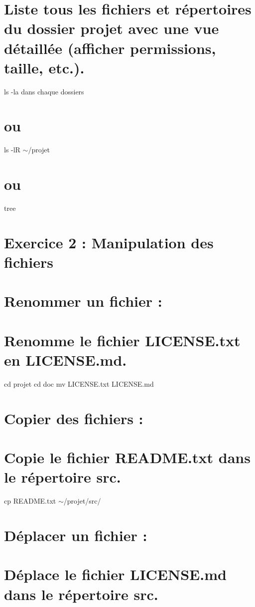 \section*{Liste tous les fichiers et répertoires du dossier projet avec une vue détaillée (afficher permissions, taille, etc.).}

ls -\/la dans chaque dossiers \section*{ou}

ls -\/lR $\sim$/projet \section*{ou}

tree

\section*{Exercice 2 \+: Manipulation des fichiers}

\section*{Renommer un fichier \+:}

\section*{Renomme le fichier L\+I\+C\+E\+N\+S\+E.\+txt en L\+I\+C\+E\+N\+S\+E.\+md.}

cd projet cd doc mv L\+I\+C\+E\+N\+S\+E.\+txt L\+I\+C\+E\+N\+S\+E.\+md

\section*{Copier des fichiers \+:}

\section*{Copie le fichier R\+E\+A\+D\+M\+E.\+txt dans le répertoire src.}

cp R\+E\+A\+D\+M\+E.\+txt $\sim$/projet/src/

\section*{Déplacer un fichier \+:}

\section*{Déplace le fichier L\+I\+C\+E\+N\+S\+E.\+md dans le répertoire src.}

